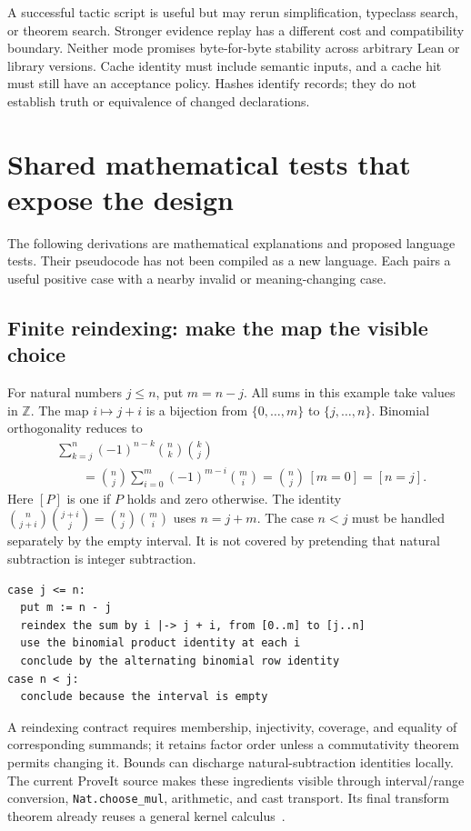 \documentclass[11pt,letterpaper]{article}
\newcommand{\code}[1]{\nolinkurl{#1}}
\newcommand{\Z}{\mathbb Z}
\begin{document}
A successful tactic script is useful but may rerun simplification, typeclass
search, or theorem search. Stronger evidence replay has a different cost and
compatibility boundary. Neither mode promises byte-for-byte stability across
arbitrary Lean or library versions. Cache identity must include semantic inputs,
and a cache hit must still have an acceptance policy. Hashes identify records;
they do not establish truth or equivalence of changed declarations.

\section{Shared mathematical tests that expose the design}\label{sec:examples}
The following derivations are mathematical explanations and proposed language
tests. Their pseudocode has not been compiled as a new language. Each pairs a
useful positive case with a nearby invalid or meaning-changing case.

\subsection{Finite reindexing: make the map the visible choice}
For natural numbers \(j\leq n\), put \(m=n-j\). All sums in this example take values in \(\Z\). The map \(i\mapsto j+i\) is a bijection from
\(\{0,\ldots,m\}\) to \(\{j,\ldots,n\}\). Binomial orthogonality reduces to
\begin{align*}
 &\sum_{k=j}^{n}(-1)^{n-k}\binom nk\binom kj\\
 &\qquad=\binom nj\sum_{i=0}^{m}(-1)^{m-i}\binom mi
 =\binom nj\,[m=0]=[n=j].
\end{align*}
Here \([P]\) is one if \(P\) holds and zero otherwise. The identity
\(\binom n{j+i}\binom{j+i}j=\binom nj\binom mi\) uses \(n=j+m\).
The case \(n<j\) must be handled separately by the empty interval. It is not
covered by pretending that natural subtraction is integer subtraction.

\begin{lstlisting}
case j <= n:
  put m := n - j
  reindex the sum by i |-> j + i, from [0..m] to [j..n]
  use the binomial product identity at each i
  conclude by the alternating binomial row identity
case n < j:
  conclude because the interval is empty
\end{lstlisting}

A reindexing contract requires membership, injectivity, coverage, and equality
of corresponding summands; it retains factor order unless a commutativity theorem
permits changing it. Bounds can discharge natural-subtraction identities locally.
The current ProveIt source makes these ingredients visible through interval/range
conversion, \code{Nat.choose_mul}, arithmetic, and cast transport. Its final
transform theorem already reuses a general kernel calculus~\cite{p-binomial}.
\end{document}

